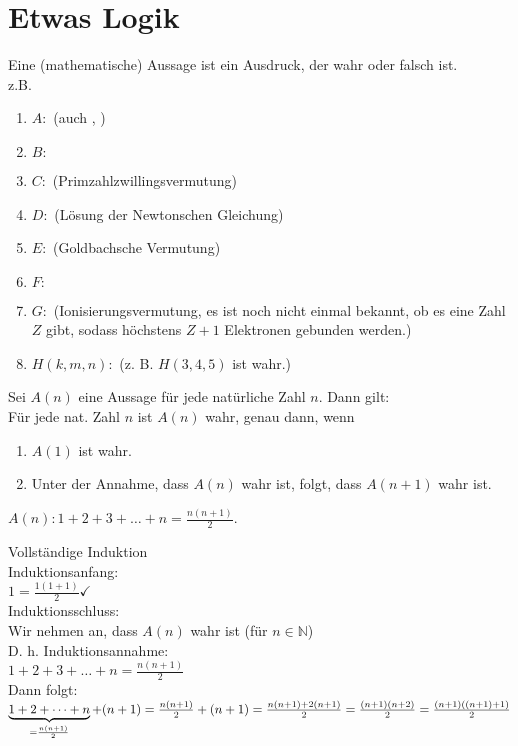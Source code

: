 \documentclass[../ana1.tex]{subfiles}
\begin{document}
\section{Etwas Logik}
Eine (mathematische) Aussage ist ein Ausdruck, der wahr oder falsch ist.\\
z.B.
\begin{enumerate}
	\item \(A :\)   (auch , )
	\item \(B :\) 
	\item \(C :\)  (Primzahlzwillingsvermutung)
	\item \(D :\)  (Lösung der Newtonschen Gleichung)
	\item \(E :\)  (Goldbachsche Vermutung)
	\item \(F :\) 
	\item \(G :\)  (Ionisierungsvermutung, es ist noch nicht einmal bekannt, ob es eine Zahl \(Z\) gibt, sodass höchstens \(Z+1\) Elektronen gebunden werden.)
	\item \(H(k,m,n) :\)  (z. B. \(H(3,4,5)\) ist wahr.)
\end{enumerate}
Sei  \(A(n)\) eine Aussage für jede natürliche Zahl \(n\). Dann gilt:\\
Für jede nat. Zahl \(n\) ist \(A(n)\) wahr, genau dann, wenn
\begin{enumerate}
	\item \(A(1)\) ist wahr.
	\item Unter der Annahme, dass \(A(n)\) wahr ist, folgt, dass \(A(n+1)\) wahr ist.
\end{enumerate}
\begin{bsp}
	\(A(n): 1+2+3+\dots+n=\frac{n(n+1)}{2}\).
\end{bsp}
\begin{bew}
	Vollständige Induktion\\
	Induktionsanfang:\\
	\(1 = \frac{1(1+1)}{2} \checkmark\)\\
	Induktionsschluss:\\
	Wir nehmen an, dass \(A(n)\) wahr ist (für \(n\in\mathbb{N}\))\\
	D. h. Induktionsannahme:\\
	\(1+2+3+\dots+n=\frac{n(n+1)}{2}\)\\
	Dann folgt:\\
	\(\underbrace{1+2+\dots+n}_{=\frac{n(n+1)}{2}}+(n+1)=\frac{n(n+1)}{2}+(n+1) \\
	=\frac{n(n+1) + 2(n+1)}{2} = \frac{(n+1)(n+2)}{2} = \frac{(n+1)((n+1)+1)}{2}\)
\end{bew}
\end{document}
